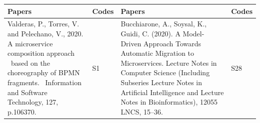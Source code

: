\documentclass{article}
\begin{document}
\pagebreak

\begin{appendices}
\begin{table}
\begin{center}
\scriptsize
\begin{tabular}{ | m{20em} | m{1cm}| m{20em} | m{1cm} | }
\hline
\textbf{Papers}                                                                                                                                                                                                                                                                                                                         & \textbf{Codes} & \textbf{Papers}                                                                                                                                                                                                                                                                                                                                                                                                              & \textbf{Codes}  \\ 
\hline
\textcolor[rgb]{0.2,0.2,0.2}{Valderas, P., Torres, V. and Pelechano, V., 2020. A microservice composition approach \ based on the choreography of BPMN fragments. ~Information and Software Technology, 127, p.106370.}                                                                                                                                                           & {S1}             & Bucchiarone, A., Soysal, K.,  Guidi, C. (2020). A Model-Driven Approach Towards Automatic Migration to Microservices. Lecture Notes in Computer Science (Including Subseries Lecture Notes in Artificial Intelligence and  Lecture Notes in Bioinformatics), 12055 LNCS, 15–36.                                                                                                                                                 & S28           \\ 
\hline


\end{tabular}
\end{center}
\end{table}
\end{appendices}
\end{document}
